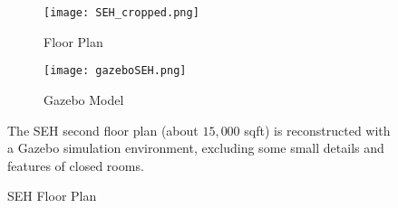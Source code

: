 \begin{figure}[!t]
\centering
    	\begin{subfigure}[t]{0.4\columnwidth}
           	\centering
          	\texttt{[image: SEH\_cropped.png]}
        		\caption{Floor Plan}
    	\end{subfigure}
	\hspace*{0.1\textwidth}
    	\begin{subfigure}[t]{0.4\columnwidth}
           	\centering
          	\texttt{[image: gazeboSEH.png]}
        		\caption{Gazebo Model}
    	\end{subfigure}
	\caption{SEH Floor Plan}
	\medskip
	\small
	The SEH second floor plan (about $15,000$ sqft) is reconstructed with a Gazebo simulation environment, excluding some small details and features of closed rooms.
	\label{fig:SEHEnvironment}
\end{figure}



